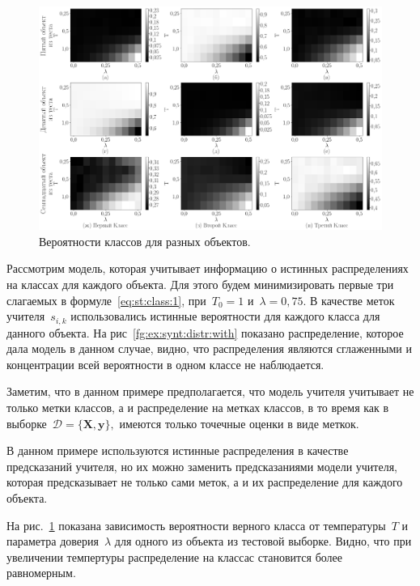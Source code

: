 \documentclass[12pt, twoside]{article}
\begin{document}
\begin{figure}[h!t]\center
\includegraphics[width=1\textwidth]{figures/syn_T_lambda}
\caption{Вероятности классов для разных объектов.}
\label{fg:ex:synt:distr:lambda_T}
\end{figure}

Рассмотрим модель, которая учитывает информацию о истинных распределениях на классах для каждого объекта. Для этого будем минимизировать первые три слагаемых в формуле~\eqref{eq:st:class:1}, при~$T_0=1$ и~$\lambda=0{,}75$. В качестве меток учителя~$s_{i,k}$ использовались истинные вероятности для каждого класса для данного объекта. На рис~\ref{fg:ex:synt:distr:with} показано распределение, которое дала модель в данном случае, видно, что распределения являются сглаженными и концентрации всей вероятности в одном классе не наблюдается.

Заметим, что в данном примере предполагается, что модель учителя учитывает не только метки классов, а и распределение на метках классов, в то время как в выборке~$\mathcal{D} = \{\mathbf{X}, \mathbf{y}\},$ имеются только точечные оценки в виде меткок. 

В данном примере используются истинные распределения в качестве предсказаний учителя, но их можно заменить предсказаниями модели учителя, которая предсказывает не только сами меток, а и их распределение для каждого объекта.

На рис.~\ref{fg:ex:synt:distr:lambda_T} показана зависимость вероятности верного класса от температуры~$T$ и параметра доверия~$\lambda$ для одного из объекта из тестовой выборке. Видно, что при увеличении темпертуры распределение на классас становится более равномерным.
\end{document}
